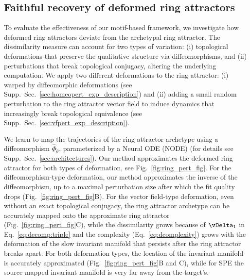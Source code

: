 \documentclass{article}
\theoremstyle{definition} \newtheorem{definition}{Definition}  \newtheorem{example}{Example}
\theoremstyle{remark} \newtheorem{remark}{Remark}
\newcounter{ct}
\newcommand{\homeo}{\Phi} %
\begin{document}
\subsection{Faithful recovery of deformed ring attractors}\label{sec:imp_ring}
To evaluate the effectiveness of our motif-based framework, we investigate how deformed ring attractors deviate from the archetypal ring attractor. 
The dissimilarity measure can account for two types of variation: 
(i) topological deformations that preserve the qualitative structure via diffeomorphisms, and 
(ii) perturbations that break topological conjugacy, altering the underlying computation.
%
We apply two different deformations to the ring attractor:
(i) warped by diffeomorphic deformations (see Supp.~Sec.~\ref{sec:homeopert_exp_description}) and 
(ii) adding a small random perturbation to the ring attractor vector field to induce dynamics that increasingly break topological equivalence (see Supp.~Sec.~\ref{sec:vfpert_exp_description}).


We learn to map the trajectories of the ring attractor archetype using a  diffeomorphism \( \hat{\homeo}_\theta \), parameterized by a Neural ODE (NODE) \citep{chen2018neural} (for details see Supp.~Sec.~\ref{sec:architectures}).
Our method approximates the deformed ring attractor for both types of deformation, see Fig.~\ref{fig:ring_pert_fig}.
For the diffeomorphism-type deformation, our method approximates the inverse of the diffeomorphism, up to a maximal perturbation size after which the fit quality drops (Fig.~\ref{fig:ring_pert_fig}B).
For the vector field-type deformation, even without an exact topological conjugacy, the ring attractor archetype can be accurately mapped onto the approximate ring attractor (Fig.~\ref{fig:ring_pert_fig}C), while the dissimilarity grows because of $\vDelta_1$ in Eq.~\ref{eq:decomp:triple} and the complexity (Eq.~\ref{eq:dcomplexity}) grows with the deformation of the slow invariant manifold that persists after the ring attractor breaks apart.
For both deformation types, the location of the invariant manifold is accurately approximated (Fig.~\ref{fig:ring_pert_fig}B and C), while for SPE the source-mapped invariant manifold is very far away from the target's.
\end{document}

